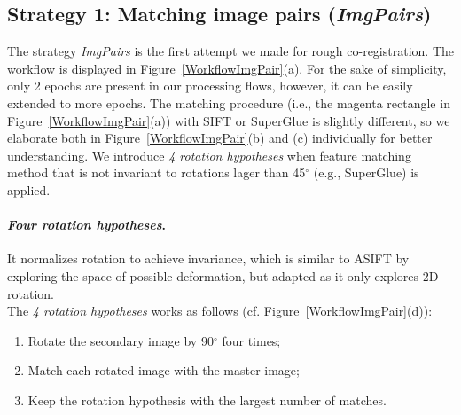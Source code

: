 \subsection{Strategy 1: Matching image pairs (\textit{ImgPairs})}
The strategy \textit{ImgPairs} is the first attempt we made for rough co-registration. %
The workflow is displayed in Figure~\ref{WorkflowImgPair}(a). For the sake of simplicity, only 2 epochs are present in our processing flows, however, it can be easily extended to more epochs. The matching procedure (i.e., the magenta rectangle in Figure~\ref{WorkflowImgPair}(a)) with SIFT or SuperGlue is slightly different, so we elaborate both in Figure~\ref{WorkflowImgPair}(b) and (c) individually for better understanding. We introduce \textit{4 rotation hypotheses} when feature matching method that is not invariant to rotations lager than 45$^\circ$ (e.g., SuperGlue) is applied.\\
\paragraph{\textit{Four rotation hypotheses}.} It normalizes rotation to achieve invariance, which is similar to ASIFT \cite{morel2009asift} by exploring the space of possible deformation, but adapted as it only explores 2D rotation.\\
The \textit{4 rotation hypotheses} works as follows (cf. Figure~\ref{WorkflowImgPair}(d)): 
\begin{enumerate}
    \item Rotate the secondary image by 90$^{\circ}$ four times;
    \item Match each rotated image with the master image;
    \item Keep the rotation hypothesis with the largest number of matches.
\end{enumerate}
\par
